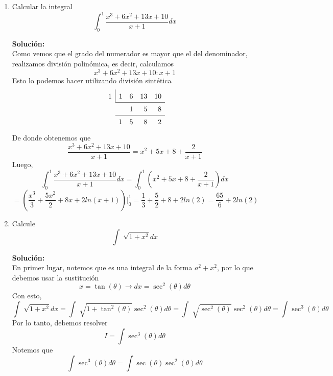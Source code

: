 \documentclass[12pt]{article}
\newenvironment{solucion}
{\begin{mdframed}[backgroundcolor=black!10]
		{\bf Solución:}\\
	}
	{
	\end{mdframed}
}
\newenvironment{preguntas}
{\begin{enumerate}\itemsep12pt
	}
	{
	\end{enumerate}
}
\newcommand{\ev}{\Big|}
\newcommand{\ra}{\rightarrow}
\begin{document}
\begin{preguntas}
\begin{solucion}
		$$\dfrac{1}{x(2-x)} = \dfrac{2A-Ax + Bx}{x(2-x)}$$
		$$\dfrac{1}{x(2-x)} = \dfrac{2A+ (B-A)x}{x(2-x)}$$
		De esta forma, tenemos el siguiente sistema de ecuaciones
		$$2A = 1, \quad B-A = 0 \ra A = \dfrac{1}{2}, \quad B = \dfrac{1}{2}$$
		Entonces, tenemos que la descomposición es
		$$\dfrac{1}{x(2-x)} = \dfrac{1}{2x} + \dfrac{1}{2(2-x)}$$
		Luego, la integral original la podemos escribir como
		$$\displaystyle\int \dfrac{dx}{x(2-x)} = \displaystyle\int \dfrac{dx}{2x} + \displaystyle\int \dfrac{dx}{2(2-x)}$$
		$$ = \dfrac{1}{2} \left( \displaystyle\int \dfrac{dx}{x} + \displaystyle\int \dfrac{dx}{2-x} \right)$$
		$$ = \dfrac{1}{2} (ln|x| - ln|2-x| ) + c$$
\end{solucion}
\item Calcular la integral
	$$\displaystyle\int_0^1 \dfrac{x^3+6x^2+13x+10}{x+1}dx$$
\begin{solucion}
Como vemos que el grado del numerador es mayor que el del denominador, realizamos división polinómica, es decir, calculamos
		$$x^3+6x^2+13x+10 : x+1$$
		Esto lo podemos hacer utilizando división sintética
		$$
		\renewcommand\arraystretch{1.5}
		\setlength\doublerulesep{0pt}
		\begin{array}{rrrrr}
		\multicolumn{1}{r|}{1} & 1 & 6 & 13 & 10\\\cline{2-5}
		& & 1& 5 & 8 \\\cline{2-5}
		& 1 & 5& 8 & 2 
		\end{array}
		$$
		De donde obtenemos que
		$$\dfrac{x^3+6x^2+13x+10}{x+1} = x^2 +5x + 8 + \dfrac{2}{x+1}$$
		Luego,
		$$\displaystyle\int_0^1 \dfrac{x^3+6x^2+13x+10}{x+1}dx = \displaystyle\int_0^1 \left(x^2 + 5x + 8 +  \dfrac{2}{x+1}\right)dx$$
		$$= \left( \dfrac{x^3}{3} + \dfrac{5x^2}{2} + 8x + 2ln(x+1)\right) \ev_0^1 = \dfrac{1}{3} + \dfrac{5}{2} + 8 + 2ln(2) = \dfrac{65}{6} + 2 ln(2)$$
\end{solucion}
\item Calcule
$$\displaystyle\int \sqrt[]{1+x^2}dx$$
\begin{solucion}
En primer lugar, notemos que es una integral de la forma $a^2 + x^2$, por lo que debemos usar la sustitución
$$x = \tan(\theta) \ra dx = \sec^2(\theta)d\theta$$
Con esto,
$$\displaystyle\int \sqrt[]{1+x^2}dx =
\displaystyle\int \sqrt[]{1+\tan^2(\theta)}\sec^2(\theta)d\theta =
\displaystyle\int \sqrt[]{\sec^2(\theta)}\sec^2(\theta)d\theta =
\displaystyle\int \sec^3(\theta)d\theta
$$
Por lo tanto, debemos resolver
$$I = \displaystyle\int \sec^3(\theta)d\theta$$
Notemos que
$$\displaystyle\int \sec^3(\theta)d\theta =
\displaystyle\int \sec(\theta)\sec^2(\theta)d\theta
$$
\end{solucion}
\end{preguntas}
\end{document}
